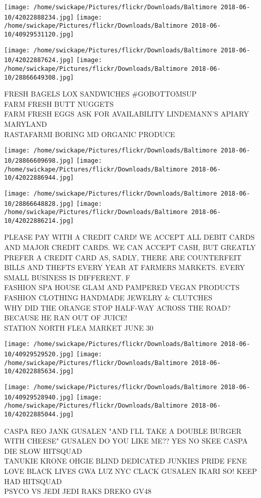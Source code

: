 \documentclass[10pt,letterpaper]{article}
\begin{document}
\texttt{[image: /home/swickape/Pictures/flickr/Downloads/Baltimore 2018-06-10/42022888234.jpg]}
\texttt{[image: /home/swickape/Pictures/flickr/Downloads/Baltimore 2018-06-10/40929531120.jpg]}

\texttt{[image: /home/swickape/Pictures/flickr/Downloads/Baltimore 2018-06-10/42022887624.jpg]}
\texttt{[image: /home/swickape/Pictures/flickr/Downloads/Baltimore 2018-06-10/28866649308.jpg]}

FRESH BAGELS LOX SANDWICHES \#GOBOTTOMSUP\\
FARM FRESH BUTT NUGGETS\\
FARM FRESH EGGS ASK FOR AVAILABILITY LINDEMANN'S APIARY MARYLAND\\
RASTAFARMI BORING MD ORGANIC PRODUCE
\pagebreak

\texttt{[image: /home/swickape/Pictures/flickr/Downloads/Baltimore 2018-06-10/28866609698.jpg]}
\texttt{[image: /home/swickape/Pictures/flickr/Downloads/Baltimore 2018-06-10/42022886944.jpg]}

\texttt{[image: /home/swickape/Pictures/flickr/Downloads/Baltimore 2018-06-10/28866648828.jpg]}
\texttt{[image: /home/swickape/Pictures/flickr/Downloads/Baltimore 2018-06-10/42022886214.jpg]}

PLEASE PAY WITH A CREDIT CARD!  WE ACCEPT ALL DEBIT CARDS AND MAJOR CREDIT CARDS.  WE CAN ACCEPT CASH, BUT GREATLY PREFER A CREDIT CARD AS, SADLY, THERE ARE COUNTERFEIT BILLS AND THEFTS EVERY YEAR AT FARMERS MARKETS.  EVERY SMALL BUSINESS IS DIFFERENT.  F\\
FASHION SPA HOUSE GLAM AND PAMPERED VEGAN PRODUCTS FASHION CLOTHING HANDMADE JEWELRY \& CLUTCHES\\
WHY DID THE ORANGE STOP HALF{-}WAY ACROSS THE ROAD?  BECAUSE HE RAN OUT OF JUICE!\\
STATION NORTH FLEA MARKET JUNE 30
\pagebreak

\texttt{[image: /home/swickape/Pictures/flickr/Downloads/Baltimore 2018-06-10/40929529520.jpg]}
\texttt{[image: /home/swickape/Pictures/flickr/Downloads/Baltimore 2018-06-10/42022885634.jpg]}

\texttt{[image: /home/swickape/Pictures/flickr/Downloads/Baltimore 2018-06-10/40929528940.jpg]}
\texttt{[image: /home/swickape/Pictures/flickr/Downloads/Baltimore 2018-06-10/42022885044.jpg]}

CASPA REO JANK GUSALEN "AND I'LL TAKE A DOUBLE BURGER WITH CHEESE" GUSALEN DO YOU LIKE ME?? YES NO SKEE CASPA DIE SLOW HITSQUAD\\
TANUKIE KRONE OHGIE BLIND DEDICATED JUNKIES PRIDE FENE\\
LOVE BLACK LIVES GWA LUZ NYC CLACK GUSALEN IKARI SO!  KEEP HAD HITSQUAD\\
PSYCO VS JEDI JEDI RAKS DREKO GV48
\pagebreak
\end{document}
